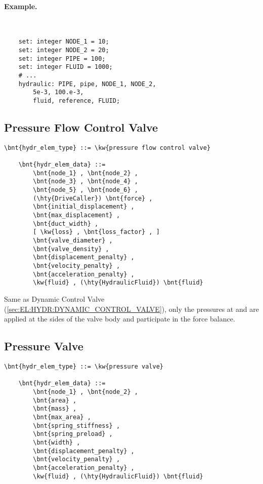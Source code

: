 \paragraph{Example.} \
\begin{verbatim}
    set: integer NODE_1 = 10;
    set: integer NODE_2 = 20;
    set: integer PIPE = 100;
    set: integer FLUID = 1000;
    # ...
    hydraulic: PIPE, pipe, NODE_1, NODE_2,
        5e-3, 100.e-3,
        fluid, reference, FLUID;
\end{verbatim}



\subsection{Pressure Flow Control Valve}
\label{sec:EL:HYDR:PRESSURE_FLOW_CONTROL_VALVE}
\begin{Verbatim}[commandchars=\\\{\}]
    \bnt{hydr_elem_type} ::= \kw{pressure flow control valve}

    \bnt{hydr_elem_data} ::=
        \bnt{node_1} , \bnt{node_2} ,
        \bnt{node_3} , \bnt{node_4} ,
        \bnt{node_5} , \bnt{node_6} ,
        (\hty{DriveCaller}) \bnt{force} ,
        \bnt{initial_displacement} ,
        \bnt{max_displacement} ,
        \bnt{duct_width} ,
        [ \kw{loss} , \bnt{loss_factor} , ]
        \bnt{valve_diameter} ,
        \bnt{valve_density} ,
        \bnt{displacement_penalty} ,
        \bnt{velocity_penalty} ,
        \bnt{acceleration_penalty} ,
        \kw{fluid} , (\hty{HydraulicFluid}) \bnt{fluid}
\end{Verbatim}
Same as Dynamic Control Valve (\ref{sec:EL:HYDR:DYNAMIC_CONTROL_VALVE}),
only the pressures at \nt{node\_5} and \nt{node\_6} are applied
at the sides of the valve body and participate in the force balance.



\subsection{Pressure Valve}
\label{sec:EL:HYDR:PRESSURE_VALVE}
\begin{Verbatim}[commandchars=\\\{\}]
    \bnt{hydr_elem_type} ::= \kw{pressure valve}

    \bnt{hydr_elem_data} ::=
        \bnt{node_1} , \bnt{node_2} ,
        \bnt{area} ,
        \bnt{mass} ,
        \bnt{max_area} ,
        \bnt{spring_stiffness} ,
        \bnt{spring_preload} ,
        \bnt{width} ,
        \bnt{displacement_penalty} ,
        \bnt{velocity_penalty} ,
        \bnt{acceleration_penalty} ,
        \kw{fluid} , (\hty{HydraulicFluid}) \bnt{fluid}
\end{Verbatim}



